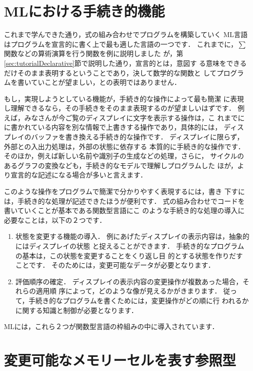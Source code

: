 \documentclass{jbook}
\begin{document}
\section{MLにおける手続き的機能}
\label{sec:tutorialImperative}


	これまで学んできた通り，式の組み合わせでプログラムを構築していく
ML言語はプログラムを宣言的に書く上で最も適した言語の一つです．
	これまでに，$\sum$関数などの算術演算を行う関数を例に説明しました
が，第\ref{sec:tutorialDeclarative}節で説明した通り，宣言的とは，意図す
る意味をできるだけそのまま表明するということであり，決して数学的な関数と
してプログラムを書いていことが望ましい，との表明ではありません．

	もし，実現しようとしている機能が，手続き的な操作によって最も簡潔
に表現し理解できるなら，その手続きをそのまま表現するのが望ましいはずです．
	例えば，みなさんが今ご覧のディスプレイに文字を表示する操作は，こ
れまでにに書かれている内容を別な情報で上書きする操作であり，具体的には，
ディスプレイのバッファを書き換える手続き的な操作です．
	ディスプレイに限らず，外部との入出力処理は，外部の状態に依存する
本質的に手続き的な操作です．
	そのほか，例えば新しい名前や識別子の生成などの処理，さらに，
サイクルのあるグラフの変換なども，手続き的なモデルで理解しプログラムした
ほが，より宣言的な記述になる場合が多いと言えます．

	このような操作をプログラムで簡潔で分かりやすく表現するには，書き
下すには，手続き的な処理が記述できたほうが便利です．
	式の組み合わせでコードを書いていくことが基本である関数型言語にこ
のような手続き的な処理の導入に必要なことは，以下の２つです．
\begin{enumerate}
\item 状態を変更する機能の導入．
	例にあげたディスプレイの表示内容は，抽象的にはディスプレイの状態
と捉えることができます．
	手続き的なプログラムの基本は，この状態を変更することをくり返し目
的とする状態を作りだすことです．
	そのためには，変更可能なデータが必要となります．
\item 評価順序の確定．
	ディスプレイの表示内容の変更操作が複数あった場合，それらの適用順
序によって，どのような像が見えるかがきまります．
	従って，手続き的なプログラムを書くためには，変更操作がどの順に行
われるかに関する知識と制御が必要となります．
\end{enumerate}
	MLには，これら２つが関数型言語の枠組みの中に導入されています．

\section{変更可能なメモリーセルを表す参照型}
\label{sec:tutorialRef}
\end{document}
